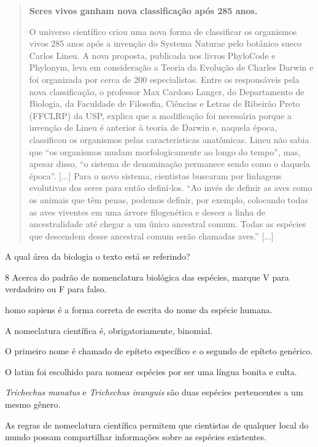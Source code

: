 \begin{quote}
\textbf{Seres vivos ganham nova classificação após 285 anos.}

O universo científico criou uma nova forma de classificar os organismos
vivos 285 anos após a invenção do Systema Naturae pelo botânico sueco
Carlos Lineu. A nova proposta, publicada nos livros PhyloCode e
Phylonym, leva em consideração a Teoria da Evolução de Charles Darwin e
foi organizada por cerca de 200 especialistas. 
Entre os responsáveis
pela nova classificação, o professor Max Cardoso Langer, do Departamento
de Biologia, da Faculdade de Filosofia, Ciências e Letras de Ribeirão
Preto (FFCLRP) da USP, explica que a modificação foi necessária porque a
invenção de Lineu é anterior à teoria de Darwin e, naquela época,
classificou os organismos pelas características anatômicas. Lineu não
sabia que ``os organismos mudam morfologicamente ao longo do tempo'',
mas, apesar disso, ``o sistema de denominação permanece sendo como o
daquela época''.  [...]
Para o novo sistema, cientistas buscaram por linhagens
evolutivas dos seres para então defini-los. ``Ao invés de definir as
aves como os animais que têm penas, podemos definir, por exemplo,
colocando todas as aves viventes em uma árvore filogenética e descer a
linha de ancestralidade até chegar a um único ancestral comum. Todas as
espécies que descendem desse ancestral comum serão chamadas aves.'' [...]

\end{quote}

A qual área da biologia o texto está se referindo?



\pagebreak
\num{8}  Acerca do padrão de nomenclatura biológica das espécies, marque V para verdadeiro ou F para falso.

\begin{boxlist}
 homo sapiens é a forma correta de escrita do nome da espécie humana.

 A nomeclatura científica é, obrigatoriamente, binomial.

 O primeiro nome é chamado de epíteto específico e o segundo de
epíteto genérico.

 O latim foi escolhido para nomear espécies por ser uma língua bonita
e culta.

 \emph{Trichechus manatus} e \emph{Trichechus inunguis} são duas
espécies pertencentes a um mesmo gênero.

 As regras de nomeclatura científica permitem que cientistas de
qualquer local do mundo possam compartilhar informações sobre as
espécies existentes.
\end{boxlist}

